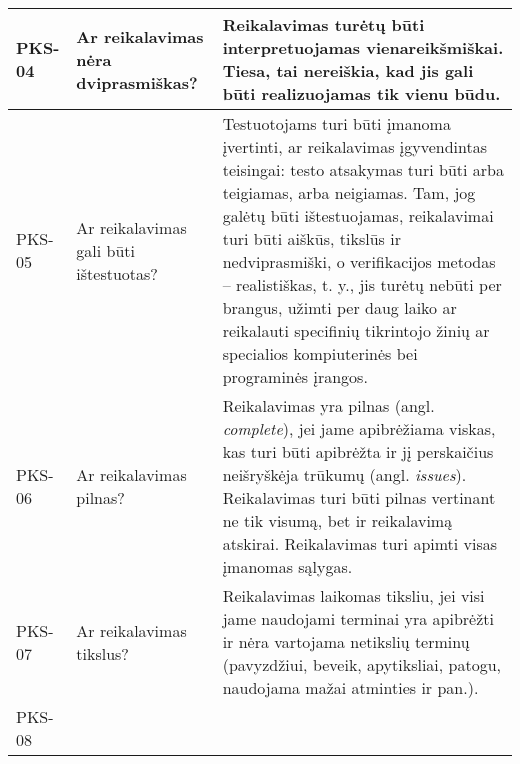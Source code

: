 \documentclass{VUMIFPSkursinis}
\begin{document}
\begin{center}
\begin{longtable}{|C{2cm}|L{5cm}|L{8cm}|}
		PKS-04                                                                        &
		Ar reikalavimas nėra dviprasmiškas?                                           &
		Reikalavimas turėtų būti interpretuojamas \textbf{vienareikšmiškai}. Tiesa, tai nereiškia, kad jis gali būti realizuojamas tik vienu būdu.                                                                                                                                                                                                                                                                                                    \\ \hline
		PKS-05                                                                        &
		Ar reikalavimas gali būti ištestuotas?                                        &
		Testuotojams turi būti įmanoma įvertinti, ar reikalavimas įgyvendintas teisingai: testo atsakymas turi būti arba teigiamas, arba neigiamas. Tam, jog galėtų būti ištestuojamas, reikalavimai turi būti aiškūs, tikslūs ir nedviprasmiški, o verifikacijos metodas -- realistiškas, t. y., jis turėtų nebūti per brangus, užimti per daug laiko ar reikalauti specifinių tikrintojo žinių ar specialios kompiuterinės bei programinės įrangos. \\ \hline
		PKS-06                                                                        &
		Ar reikalavimas pilnas?                                                       &
		Reikalavimas yra pilnas (angl. \textit{complete}), jei jame apibrėžiama viskas, kas turi būti apibrėžta ir jį perskaičius neišryškėja trūkumų (angl. \textit{issues}). Reikalavimas turi būti pilnas vertinant ne tik visumą, bet ir reikalavimą atskirai. Reikalavimas turi apimti visas įmanomas sąlygas.                                                                                                                                   \\ \hline
		PKS-07                                                                        &
		Ar reikalavimas tikslus?                                                      &
		Reikalavimas laikomas tiksliu, jei visi jame naudojami terminai yra apibrėžti ir nėra vartojama netikslių terminų (pavyzdžiui, beveik, apytiksliai, patogu, naudojama mažai atminties ir pan.).                                                                                                                                                                                                                                               \\ \hline
		PKS-08                                                                        &

\end{longtable}
\end{center}
\end{document}
